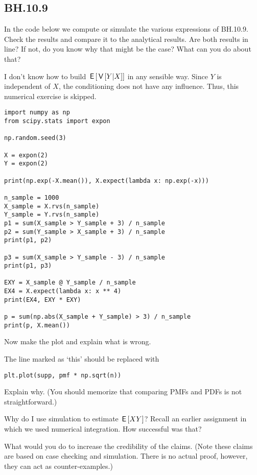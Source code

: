 

\subsection{BH.10.9}


\begin{exercise}
In the code below we compute or simulate the various expressions of BH.10.9. Check the results and compare it to the analytical results. Are both results in line? If not, do you know why that might be the case? What can you do about that?

I don't know how to build $\,\mathsf{E}\left[\,\mathsf{V}\left[Y|X\right]\right]$ in any sensible way. Since $Y$ is independent of $X$, the conditioning does not have any influence. Thus, this numerical exercise is skipped.
\end{exercise}

\begin{verbatim}
import numpy as np
from scipy.stats import expon

np.random.seed(3)

X = expon(2)
Y = expon(2)

print(np.exp(-X.mean()), X.expect(lambda x: np.exp(-x)))

n_sample = 1000
X_sample = X.rvs(n_sample)
Y_sample = Y.rvs(n_sample)
p1 = sum(X_sample > Y_sample + 3) / n_sample
p2 = sum(Y_sample > X_sample + 3) / n_sample
print(p1, p2)

p3 = sum(X_sample > Y_sample - 3) / n_sample
print(p1, p3)

EXY = X_sample @ Y_sample / n_sample
EX4 = X.expect(lambda x: x ** 4)
print(EX4, EXY * EXY)

p = sum(np.abs(X_sample + Y_sample) > 3) / n_sample
print(p, X.mean())
\end{verbatim}


\begin{exercise}
Now make the plot and  explain what is wrong.
\end{exercise}

\begin{exercise}
The line  marked as `this' should be replaced with
\begin{verbatim}
plt.plot(supp, pmf * np.sqrt(n))
\end{verbatim}
Explain why.  (You should memorize  that comparing PMFs and PDFs is not straightforward.)
\end{exercise}

\begin{exercise}
Why do I use simulation to estimate $\,\mathsf{E}\left[XY\right]$? Recall an earlier assignment in which we used numerical  integration. How successful was that?
\end{exercise}

\begin{exercise}
What would you do to increase the credibility of the claims. (Note these claims  are based on case checking and simulation. There is no actual proof, however, they can act as counter-examples.)
\end{exercise}


